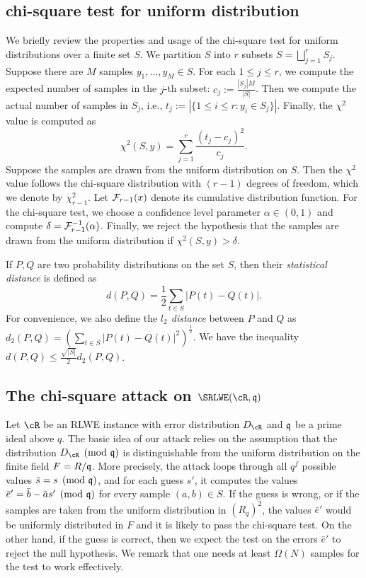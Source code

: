 \documentclass{amsart}
\begin{document}
\subsection{chi-square test for uniform distribution}
We briefly review the properties and usage of the chi-square test for uniform distributions over a finite set $S$. We partition $S$ into $r$ subsets $S = \bigsqcup_{j=1}^r S_j$.
Suppose there are $M$ samples $y_1, \ldots, y_M \in S$.
For each $1 \leq j \leq r$, we compute the expected number of samples in the $j$-th subset: $c_j := \frac{|S_j|M}{|S|}$. Then we compute the actual number of samples in $S_j$, i.e., $t_j := |\{1 \leq i \leq r: y_i \in S_j\}|$. Finally, the $\chi^2$ value is computed as
\[
    \chi^2(S,y) = \sum_{j = 1}^r \frac{(t_j -c_j)^2}{c_j}.
\]
Suppose the samples are drawn from the uniform distribution on $S$. Then the $\chi^2$ value follows the chi-square distribution with $(r-1)$ degrees of freedom, which we denote by $\chi_{r-1}^2$. Let $\mathcal{F}_{r-1}(x)$ denote its cumulative distribution function. For the chi-square test, we choose a confidence level parameter $\alpha \in (0,1)$ and compute $\delta = \mathcal{F}_{r-1}^{-1}(\alpha)$. Finally, we reject the hypothesis that the samples are drawn from the uniform distribution if $\chi^2(S,y)  > \delta$. 

If $P,Q$ are two probability distributions on the set $S$, then their {\it statistical distance} is defined as
\[
    d(P,Q) = \frac{1}{2} \sum_{t \in S} |P(t) - Q(t)|.
\]
For convenience, we also define the {\it $l_2$ distance} between $P$ and $Q$ as $d_2(P,Q) = (\sum_{t \in S} |P(t) - Q(t)|^2)^{\frac{1}{2}}$. We have the inequality $d(P,Q) \leq \frac{\sqrt{|S|}}{2}d_2(P,Q)$.


\subsection{The chi-square attack on $\SRLWE(\cR,\fq)$}

Let $\cR$ be an RLWE instance with error distribution $D_{\cR}$ and $\mathfrak{q}$ be a prime ideal above $q$.  The basic idea of our attack relies on the assumption that the distribution $D_\cR \pmod {\fq}$ is distinguishable from the uniform distribution on the finite field $F = R/\mathfrak{q}$. More precisely, the attack loops through all $q^f$ possible values $\bar{s} = s \pmod{\mathfrak{q}}$, and for each guess $s'$, it computes the values $\bar{e}' = \bar{b} - \bar{a} s' \pmod {\mathfrak{q}}$ for every sample $(a,b) \in S$. If the guess is wrong, or if the samples are taken from the uniform distribution in $(R_q)^2$, the values $\bar{e}'$ would be uniformly distributed in $F$ and it is likely to pass the chi-square test. On the other hand, if the guess is correct, then we expect the test on the errors $\bar{e}'$ to reject the null hypothesis. We remark that one needs at least $\Omega(N)$ samples for the test to work effectively. 
\end{document}
